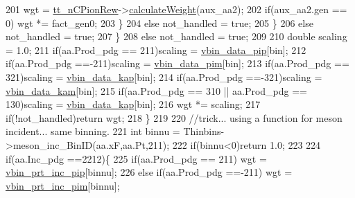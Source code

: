 \begin{DoxyCode}
201             wgt = \hyperlink{class_neutrino_flux_reweight_1_1_thin_targetnucleon_a_reweighter_ae21cb01b4e98a9d57dc4f4f61a331b1c}{tt\_nCPionRew}->\hyperlink{class_neutrino_flux_reweight_1_1_thin_targetn_c_pion_reweighter_abe918e387700a09d5878cfd22dddfdd8}{calculateWeight}(aux\_aa2);
202             \textcolor{keywordflow}{if}(aux\_aa2.gen == 0) wgt *= fact\_gen0;
203           \}      
204           \textcolor{keywordflow}{else} not\_handled = \textcolor{keyword}{true};
205         \}
206         \textcolor{keywordflow}{else} not\_handled = \textcolor{keyword}{true};
207       \}
208       \textcolor{keywordflow}{else} not\_handled = \textcolor{keyword}{true};
209       
210       \textcolor{keywordtype}{double} scaling = 1.0;
211       \textcolor{keywordflow}{if}(aa.Prod\_pdg == 211)scaling = \hyperlink{class_neutrino_flux_reweight_1_1_thin_targetnucleon_a_reweighter_ae7012b962ce5fc1297fe56722661532a}{vbin\_data\_pip}[bin];
212       \textcolor{keywordflow}{if}(aa.Prod\_pdg ==-211)scaling = \hyperlink{class_neutrino_flux_reweight_1_1_thin_targetnucleon_a_reweighter_ae0b6c63ce05db44c64d8b272ce3cbaed}{vbin\_data\_pim}[bin];
213       \textcolor{keywordflow}{if}(aa.Prod\_pdg == 321)scaling = \hyperlink{class_neutrino_flux_reweight_1_1_thin_targetnucleon_a_reweighter_acfadbda1695d49d43efe9e5a5395317b}{vbin\_data\_kap}[bin];
214       \textcolor{keywordflow}{if}(aa.Prod\_pdg ==-321)scaling = \hyperlink{class_neutrino_flux_reweight_1_1_thin_targetnucleon_a_reweighter_ae434ebe9822621ab7e5250b4057a883d}{vbin\_data\_kam}[bin];
215       \textcolor{keywordflow}{if}(aa.Prod\_pdg == 310 || aa.Prod\_pdg == 130)scaling = \hyperlink{class_neutrino_flux_reweight_1_1_thin_targetnucleon_a_reweighter_acfadbda1695d49d43efe9e5a5395317b}{vbin\_data\_kap}[bin];    
216       wgt *= scaling;
217       \textcolor{keywordflow}{if}(!not\_handled)\textcolor{keywordflow}{return} wgt;
218     \} 
219  
220     \textcolor{comment}{//trick... using a function for meson incident... same binning.}
221     \textcolor{keywordtype}{int} binnu      = Thinbins->meson\_inc\_BinID(aa.xF,aa.Pt,211);
222     \textcolor{keywordflow}{if}(binnu<0)\textcolor{keywordflow}{return} 1.0;
223 
224     \textcolor{keywordflow}{if}(aa.Inc\_pdg ==2212)\{
225       \textcolor{keywordflow}{if}(aa.Prod\_pdg == 211) wgt = \hyperlink{class_neutrino_flux_reweight_1_1_thin_targetnucleon_a_reweighter_a62d37535ba63cd757dcf40763a66d459}{vbin\_prt\_inc\_pip}[binnu];
226       \textcolor{keywordflow}{else} \textcolor{keywordflow}{if}(aa.Prod\_pdg ==-211) wgt = \hyperlink{class_neutrino_flux_reweight_1_1_thin_targetnucleon_a_reweighter_ae1652fcc9e3b525b169b0bcb8bf22a1c}{vbin\_prt\_inc\_pim}[binnu];

\end{DoxyCode}
